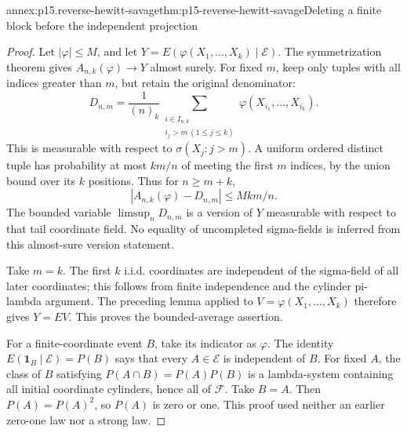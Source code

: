 \begin{annexitem}{annex:p15.reverse-hewitt-savage}{thm:p15-reverse-hewitt-savage}{Deleting a finite block before the independent projection}
\begin{proof}
Let \(|\varphi|\leq M\), and let
\(Y=E(\varphi(X_1,\ldots,X_k)\mid\mathcal E)\).
The symmetrization theorem gives \(A_{n,k}(\varphi)\to Y\)
almost surely.
For fixed \(m\), keep only tuples with all indices greater than \(m\),
but retain the original denominator:
\[
 D_{n,m}=\frac1{(n)_k}
       \sum_{\substack{i\in I_{n,k}\\i_j>m\ (1\leq j\leq k)}}
                         \varphi(X_{i_1},\ldots,X_{i_k}).
\]
This is measurable with respect to \(\sigma(X_j:j>m)\).
A uniform ordered distinct tuple has probability at most \(km/n\)
of meeting the first \(m\) indices, by the union bound over its
\(k\) positions. Thus for \(n\geq m+k\),
\[
                 |A_{n,k}(\varphi)-D_{n,m}|\leq Mkm/n.
\]
The bounded variable \(\limsup_nD_{n,m}\) is a version of \(Y\)
measurable with respect to that tail coordinate field.
No equality of uncompleted sigma-fields is inferred from this
almost-sure version statement.

Take \(m=k\). The first \(k\) i.i.d. coordinates are independent of
the sigma-field of all later coordinates; this follows from finite
independence and the cylinder pi-lambda argument.
The preceding lemma applied to
\(V=\varphi(X_1,\ldots,X_k)\) therefore gives
\(Y=EV\). This proves the bounded-average assertion.

For a finite-coordinate event \(B\), take its indicator as \(\varphi\).
The identity \(E(\mathbf1_B\mid\mathcal E)=P(B)\) says that every
\(A\in\mathcal E\) is independent of \(B\).
For fixed \(A\), the class of \(B\) satisfying
\(P(A\cap B)=P(A)P(B)\) is a lambda-system containing all initial
coordinate cylinders, hence all of \(\mathcal F\).
Take \(B=A\). Then \(P(A)=P(A)^2\), so \(P(A)\) is zero or one.
This proof used neither an earlier zero-one law nor a strong law.
\end{proof}
\end{annexitem}

